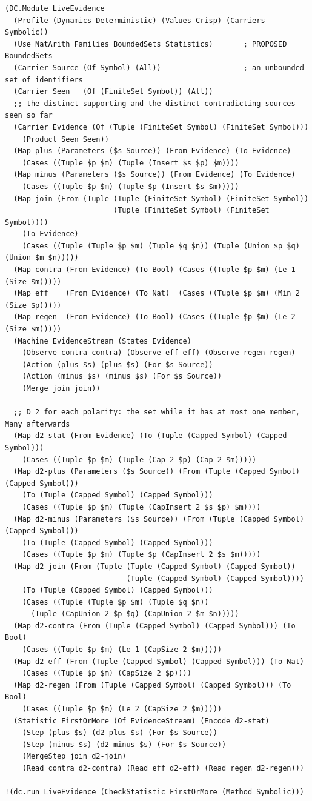 \documentclass[11pt]{article}
\theoremstyle{definition}
\theoremstyle{plain}
\begin{document}
\begin{lstlisting}[style=mettamod]
(DC.Module LiveEvidence
  (Profile (Dynamics Deterministic) (Values Crisp) (Carriers Symbolic))
  (Use NatArith Families BoundedSets Statistics)       ; PROPOSED BoundedSets
  (Carrier Source (Of Symbol) (All))                   ; an unbounded set of identifiers
  (Carrier Seen   (Of (FiniteSet Symbol)) (All))
  ;; the distinct supporting and the distinct contradicting sources seen so far
  (Carrier Evidence (Of (Tuple (FiniteSet Symbol) (FiniteSet Symbol)))
    (Product Seen Seen))
  (Map plus (Parameters ($s Source)) (From Evidence) (To Evidence)
    (Cases ((Tuple $p $m) (Tuple (Insert $s $p) $m))))
  (Map minus (Parameters ($s Source)) (From Evidence) (To Evidence)
    (Cases ((Tuple $p $m) (Tuple $p (Insert $s $m)))))
  (Map join (From (Tuple (Tuple (FiniteSet Symbol) (FiniteSet Symbol))
                         (Tuple (FiniteSet Symbol) (FiniteSet Symbol))))
    (To Evidence)
    (Cases ((Tuple (Tuple $p $m) (Tuple $q $n)) (Tuple (Union $p $q) (Union $m $n)))))
  (Map contra (From Evidence) (To Bool) (Cases ((Tuple $p $m) (Le 1 (Size $m)))))
  (Map eff    (From Evidence) (To Nat)  (Cases ((Tuple $p $m) (Min 2 (Size $p)))))
  (Map regen  (From Evidence) (To Bool) (Cases ((Tuple $p $m) (Le 2 (Size $m)))))
  (Machine EvidenceStream (States Evidence)
    (Observe contra contra) (Observe eff eff) (Observe regen regen)
    (Action (plus $s) (plus $s) (For $s Source))
    (Action (minus $s) (minus $s) (For $s Source))
    (Merge join join))

  ;; D_2 for each polarity: the set while it has at most one member, Many afterwards
  (Map d2-stat (From Evidence) (To (Tuple (Capped Symbol) (Capped Symbol)))
    (Cases ((Tuple $p $m) (Tuple (Cap 2 $p) (Cap 2 $m)))))
  (Map d2-plus (Parameters ($s Source)) (From (Tuple (Capped Symbol) (Capped Symbol)))
    (To (Tuple (Capped Symbol) (Capped Symbol)))
    (Cases ((Tuple $p $m) (Tuple (CapInsert 2 $s $p) $m))))
  (Map d2-minus (Parameters ($s Source)) (From (Tuple (Capped Symbol) (Capped Symbol)))
    (To (Tuple (Capped Symbol) (Capped Symbol)))
    (Cases ((Tuple $p $m) (Tuple $p (CapInsert 2 $s $m)))))
  (Map d2-join (From (Tuple (Tuple (Capped Symbol) (Capped Symbol))
                            (Tuple (Capped Symbol) (Capped Symbol))))
    (To (Tuple (Capped Symbol) (Capped Symbol)))
    (Cases ((Tuple (Tuple $p $m) (Tuple $q $n))
      (Tuple (CapUnion 2 $p $q) (CapUnion 2 $m $n)))))
  (Map d2-contra (From (Tuple (Capped Symbol) (Capped Symbol))) (To Bool)
    (Cases ((Tuple $p $m) (Le 1 (CapSize 2 $m)))))
  (Map d2-eff (From (Tuple (Capped Symbol) (Capped Symbol))) (To Nat)
    (Cases ((Tuple $p $m) (CapSize 2 $p))))
  (Map d2-regen (From (Tuple (Capped Symbol) (Capped Symbol))) (To Bool)
    (Cases ((Tuple $p $m) (Le 2 (CapSize 2 $m)))))
  (Statistic FirstOrMore (Of EvidenceStream) (Encode d2-stat)
    (Step (plus $s) (d2-plus $s) (For $s Source))
    (Step (minus $s) (d2-minus $s) (For $s Source))
    (MergeStep join d2-join)
    (Read contra d2-contra) (Read eff d2-eff) (Read regen d2-regen)))

!(dc.run LiveEvidence (CheckStatistic FirstOrMore (Method Symbolic)))
\end{lstlisting}
\end{document}
